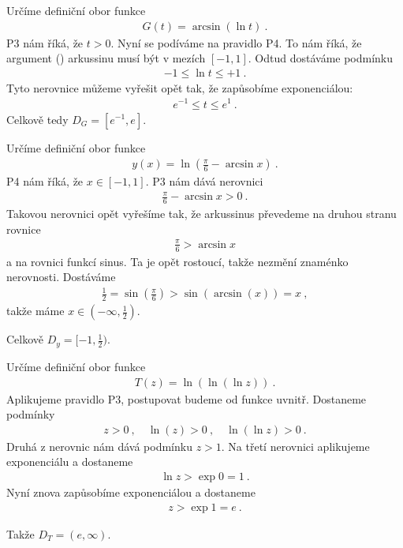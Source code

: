 \begin{example}
    Určíme definiční obor funkce \begin{align}
        G(t) = \arcsin (\ln t) \:.
    \end{align}
    P3 nám říká, že $t>0$. Nyní se podíváme na pravidlo P4. To nám říká, že argument () arkussinu musí být v mezích $[-1,1]$. Odtud dostáváme podmínku \begin{align}
        -1 \leq \ln t \leq +1 \:.
    \end{align}
    Tyto nerovnice můžeme vyřešit opět tak, že zapůsobíme exponenciálou:
    \begin{align}
        e^{-1} \leq t \leq e^1 \:.
    \end{align}
    Celkově tedy $D_G = [e^{-1},e]$.
\end{example}

\begin{example}
    Určíme definiční obor funkce \begin{align}
        y(x) = \ln \left( \frac{\pi}{6} - \arcsin x \right) \:.
    \end{align}
    P4 nám říká, že $x \in [-1,1]$. P3 nám dává nerovnici \begin{align}
        \frac{\pi}{6} - \arcsin x > 0 \:.
    \end{align}
    Takovou nerovnici opět vyřešíme tak, že arkussinus převedeme na druhou stranu rovnice
    \begin{align}
        \frac{\pi}{6} > \arcsin x
    \end{align}
    a na rovnici  funkcí sinus. Ta je opět rostoucí, takže nezmění znaménko nerovnosti. Dostáváme
    \begin{align}
        \frac{1}{2} = \sin \left( \frac{\pi}{6} \right)  > \sin (\arcsin(x)) = x \:,
    \end{align}
    takže máme $x \in (-\infty, \frac{1}{2})$.

    Celkově $D_y = [-1,\frac{1}{2})$.
\end{example}

\begin{example}[Náročnější]
    Určíme definiční obor funkce \begin{align}
        T(z) = \ln \left(\ln(\ln z) \right) \:.
    \end{align}
    Aplikujeme pravidlo P3, postupovat budeme od funkce uvnitř. Dostaneme podmínky \begin{align}
        z > 0 \:, \quad \ln (z) > 0 \:, \quad \ln (\ln z) > 0 \:.
    \end{align}
    Druhá z nerovnic nám dává podmínku $z > 1$. Na třetí nerovnici aplikujeme exponenciálu a dostaneme \begin{align}
        \ln z > \exp 0 = 1 \:.
    \end{align}
    Nyní znova zapůsobíme exponenciálou a dostaneme \begin{align}
        z >  \exp 1 = e \:.
    \end{align}

    Takže $D_T = (e, \infty)$.
\end{example}

